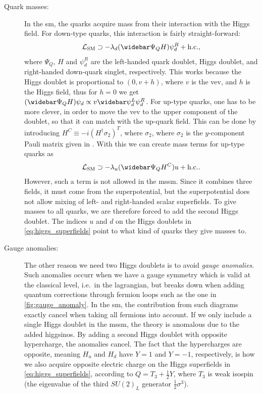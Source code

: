 \begin{description}
    \item[Quark masses:] In the \gls{sm}, the quarks acquire mass from their interaction with the Higgs field. For down-type quarks, this interaction is fairly straight-forward:
    \begin{equation}\label{eq:sm_down_mass}
        \mathcal{L}_{\mathrm{SM}} \supset -\lambda_d (\widebar\Psi_Q H)\psi_d^R + \text{h.c.},
    \end{equation}
    where $\Psi_Q$, $H$ and $\psi_d^R$ are the left-handed quark doublet, Higgs doublet, and right-handed down-quark singlet, respectively.
    This works because the Higgs doublet is proportional to $(0, v+h)$, where $v$ is the \gls{vev}, and $h$ is the Higgs field, thus for $h=0$ we get $(\widebar\Psi_Q H)\psi_d \propto v\widebar\psi_d^L\psi_d^R$.
    For up-type quarks, one has to be more clever, in order to move the \gls{vev} to the upper component of the doublet, so that it can match with the up-quark field. This can be done by introducing $H^C \equiv -i(H^\dagger \sigma_2)^T$, where $\sigma_2$, where $\sigma_2$ is the $y$-component Pauli matrix given in . With this we can create mass terms for up-type quarks as
    \begin{equation}
        \mathcal{L}_{\mathrm{SM}} \supset -\lambda_u (\widebar\Psi_Q H^C)u + \text{h.c.}.
    \end{equation}
    However, such a term is not allowed in the \gls{mssm}. Since it combines three fields, it must come from the superpotential, but the superpotential does not allow mixing of left- and right-handed scalar superfields. To give masses to all quarks, we are therefore forced to add the second Higgs doublet. The indices $u$ and $d$ on the Higgs doublets in \cref{eq:higgs_superfields} point to what kind of quarks they give masses to.
    
    \item[Gauge anomalies:] The other reason we need two Higgs doublets is to avoid \emph{gauge anomalies}. Such anomalies occurr when we have a gauge symmetry which is valid at the classical level, i.e.\ in the lagrangian, but breaks down when adding quantum corrections through fermion loops such as the one in \cref{fig:gauge_anomaly}.
    In the \gls{sm}, the contribution from such diagrams exactly cancel when taking all fermions into account. If we only include a single Higgs doublet in the \gls{mssm}, the theory is anomalous due to the added higgsinos. By adding a second Higgs doublet with opposite hypercharge, the anomalies cancel.
    The fact that the hypercharges are opposite, meaning $H_u$ and $H_d$ have $Y=1$ and $Y=-1$, respectively, is how we also acquire opposite electric charge on the Higgs superfields in \cref{eq:higgs_superfields}, according to $Q=T_3 + \frac{1}{2}Y$, where $T_3$ is weak isospin (the eigenvalue of the third $SU(2)_L$ generator $\frac{1}{2}\sigma^3$).
\end{description}

